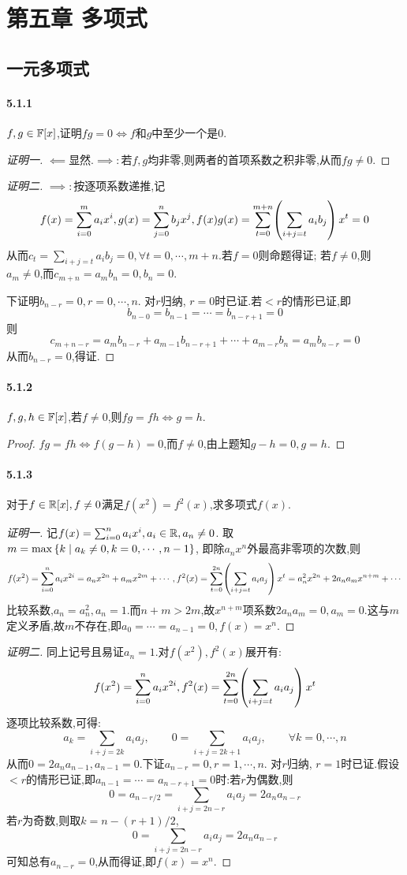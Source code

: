 \documentclass[11pt]{article}
\begin{document}
\addtocounter{section}{4}
\section{第五章 多项式}
\subsection{一元多项式}
\paragraph{5.1.1}$f,g\in\mathbb{F}[x]$,证明$fg=0\iff f$和$g$中至少一个是0.
\begin{proof}[证明一]
    $\impliedby$显然.$\implies:$若$f,g$均非零,则两者的首项系数之积非零,从而$fg\neq 0$.
\end{proof}
\begin{proof}[证明二]
    $\implies:$按逐项系数递推,记
    $$f(x)=\sum_{i=0}^{m}a_ix^i, g(x)=\sum_{j=0}^{n}b_jx^j, f(x)g(x)=\sum_{t=0}^{m+n}\!\left(\sum_{i+j=t}a_ib_j\right)x^t=0$$
    从而$c_t=\sum_{i+j=t}a_ib_j=0, \forall t=0,\cdots,m+n$.若$f=0$则命题得证; 若$f\neq 0$,则$a_m\neq 0$,而$c_{m+n}=a_mb_n=0, b_n=0$.

    下证明$b_{n-r}=0, r=0,\cdots,n$. 对$r$归纳, $r=0$时已证.若$<r$的情形已证,即
    $$b_{n-0}=b_{n-1}=\cdots=b_{n-r+1}=0$$
    则
    $$c_{m+n-r}=a_mb_{n-r}+a_{m-1}b_{n-r+1}+\cdots+a_{m-r}b_{n}=a_mb_{n-r}=0$$
    从而$b_{n-r}=0$,得证.
\end{proof}
\paragraph{5.1.2}$f,g,h\in \mathbb{F}[x]$,若$f\neq 0$,则$fg=fh\iff g=h$.
\begin{proof}
    $fg=fh\iff f(g-h)=0$,而$f\neq 0$,由上题知$g-h=0, g=h$.
\end{proof}
\paragraph{5.1.3}对于$f\in\mathbb{R}[x], f\neq 0$满足$f(x^2)=f^2(x)$,求多项式$f(x)$.
\begin{proof}[证明一]
    记$f(x)=\sum_{i=0}^{n}a_ix^i, a_i\in \mathbb{R}, a_n\neq 0$. 取$m=\max\left\{k\mid a_k\neq 0, k=0,\cdots, n-1\right\}$, 即除$a_nx^n$外最高非零项的次数,则
    $$f(x^2)=\sum_{i=0}^{n}a_i x^{2i}=a_nx^{2n}+a_mx^{2m}+\cdots, f^2(x)=\sum_{t=0}^{2n}\!\left(\sum_{i+j=t}a_ia_j\right)x^t=a_n^2 x^{2n}+2a_na_m x^{n+m}+\cdots$$
    比较系数,$a_n=a_n^2, a_n=1$.而$n+m>2m$,故$x^{n+m}$项系数$2a_na_m=0, a_m=0$.这与$m$定义矛盾,故$m$不存在,即$a_0=\cdots=a_{n-1}=0, f(x)=x^n$.
\end{proof}
\begin{proof}[证明二]
    同上记号且易证$a_n=1$.对$f(x^2),f^2(x)$展开有:
    $$f(x^2)=\sum_{i=0}^{n}a_i x^{2i}, f^2(x)=\sum_{t=0}^{2n}\!\left(\sum_{i+j=t}a_ia_j\right)x^t$$
    逐项比较系数,可得:
    $$a_k=\sum_{i+j=2k}a_ia_j,\qquad 0=\sum_{i+j=2k+1}a_ia_j,\qquad \forall k=0,\cdots,n$$
    从而$0=2a_na_{n-1}, a_{n-1}=0$.下证$a_{n-r}=0, r=1,\cdots,n$. 对$r$归纳, $r=1$时已证.假设$<r$的情形已证,即$a_{n-1}=\cdots=a_{n-r+1}=0$时:若$r$为偶数,则
    $$0=a_{n-r/2}=\sum_{i+j=2n-r}a_ia_j=2a_na_{n-r}$$
    若$r$为奇数,则取$k=n-(r+1)/2$,
    $$0=\sum_{i+j=2n-r}a_ia_j=2a_na_{n-r}$$
    可知总有$a_{n-r}=0$,从而得证,即$f(x)=x^n$.
\end{proof}
\end{document}
